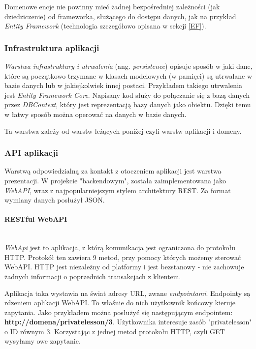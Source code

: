 \documentclass[12pt]{article}
\newcommand{\myparagraph}[1]{\paragraph{#1}\mbox{}\\}
\numberwithin{figure}{section}
\begin{document}
\begin{sloppypar}
    Domenowe encje nie powinny mieć żadnej bezpośredniej zależności (jak dziedziczenie) od frameworka, służącego do dostępu danych, jak na przykład \textit{Entity Framework} (technologia szczegółowo opisana w sekcji \ref{EF}).
        
    \subsubsection{Infrastruktura aplikacji}
    \textit{Warstwa infrastruktury i utrwalenia} (ang. \textit{persistence}) opisuje sposób w jaki dane, które są początkowo trzymane w klasach modelowych (w pamięci) są utrwalane w bazie danych lub w jakiejkolwiek innej postaci. Przykładem takiego utrwalenia jest \textit{Entity Framework Core}. Napisany kod służy do połączanie się z bazą danych przez \textit{DBContext}, który jest reprezentacją bazy danych jako obiektu. Dzięki temu w łatwy sposób można operować na danych w bazie danych.
        
    Ta warstwa zależy od warstw leżących poniżej czyli warstw aplikacji i domeny.
        
    \subsubsection{API aplikacji}
    Warstwą odpowiedzialną za kontakt z otoczeniem aplikacji jest warstwa prezentacji. W projekcie "backendowym", została zaimplementowana jako \textit{WebAPI}, wraz z najpopularniejszym stylem architektury REST. Za format wymiany danych posłużył JSON.
        
        \myparagraph{RESTful WebAPI}
        \indent
        \textit{WebApi} jest to aplikacja, z którą komunikacja jest ograniczona do protokołu HTTP. Protokół ten zawiera 9 metod, przy pomocy których możemy sterować WebAPI. 
        HTTP jest niezależny od platformy i jest bezstanowy - nie zachowuje żadnych informacji o poprzednich transakcjach z klientem. 
        
        Aplikacja taka wystawia na świat adresy URL, zwane \textit{endpointami}.
        Endpointy są rdzeniem aplikacji WebAPI. To właśnie do nich użytkownik końcowy kieruje zapytania. Jako przykładem można posłużyć się następującym endpointem: \textbf{http://domena/privatelesson/3}. Użytkownika interesuje zasób "privatelesson" o ID równym 3. Korzystając z jednej metod protokołu HTTP, czyli GET wysyłamy owe zapytanie.
        

\end{sloppypar}
\end{document}
